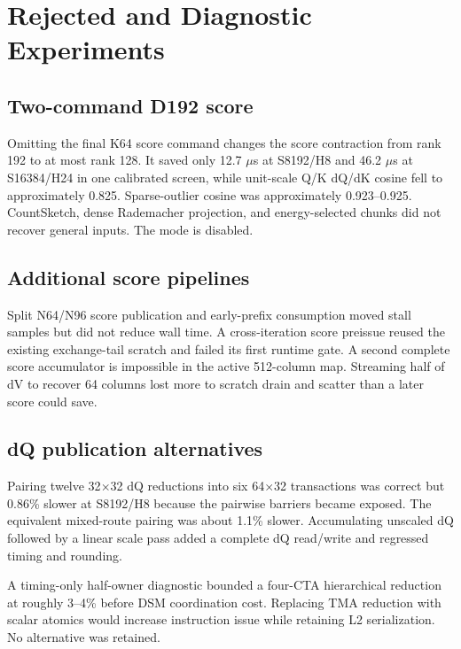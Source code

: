 \section{Rejected and Diagnostic Experiments}
\label{app:rejected}

\subsection{Two-command D192 score}

Omitting the final K64 score command changes the score contraction from rank
192 to at most rank 128.  It saved only 12.7 $\mu$s at S8192/H8 and 46.2
$\mu$s at S16384/H24 in one calibrated screen, while unit-scale Q/K dQ/dK
cosine fell to approximately 0.825.  Sparse-outlier cosine was approximately
0.923--0.925.  CountSketch, dense Rademacher projection, and energy-selected
chunks did not recover general inputs.  The mode is disabled.

\subsection{Additional score pipelines}

Split N64/N96 score publication and early-prefix consumption moved stall
samples but did not reduce wall time.  A cross-iteration score preissue reused
the existing exchange-tail scratch and failed its first runtime gate.  A
second complete score accumulator is impossible in the active 512-column map.
Streaming half of dV to recover 64 columns lost more to scratch drain and
scatter than a later score could save.

\subsection{dQ publication alternatives}

Pairing twelve 32$\times$32 dQ reductions into six 64$\times$32 transactions
was correct but 0.86\% slower at S8192/H8 because the pairwise barriers became
exposed.  The equivalent mixed-route pairing was about 1.1\% slower.
Accumulating unscaled dQ followed by a linear scale pass added a complete dQ
read/write and regressed timing and rounding.

A timing-only half-owner diagnostic bounded a four-CTA hierarchical reduction
at roughly 3--4\% before DSM coordination cost.  Replacing TMA reduction with
scalar atomics would increase instruction issue while retaining L2
serialization.  No alternative was retained.

